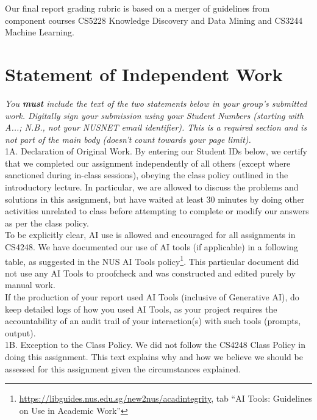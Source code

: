 \documentclass[11pt]{article}
\begin{document}
Our final report grading rubric is based on a merger of guidelines from component courses CS5228 Knowledge Discovery and Data Mining and CS3244 Machine Learning.

\section*{Statement of Independent Work}

{\it You {\bf must} include the text of the two statements below in your group's submitted work.  Digitally sign your submission using your Student Numbers (starting with A...; N.B., not your NUSNET email identifier). This is a required section and is not part of the main body (doesn't count towards your page limit).} \\

\noindent 1A. Declaration of Original Work. By entering our Student IDs below, we certify that we completed our assignment independently of all others (except where sanctioned during in-class sessions), obeying the class policy outlined in the introductory lecture. In particular, we are allowed to discuss the problems and solutions in this assignment, but have waited at least 30 minutes by doing other activities unrelated to class before attempting to complete or modify our answers as per the class policy. \\

To be explicitly clear, AI use is allowed and encouraged for all assignments in CS4248.  We have documented our use of AI tools (if applicable) in a following table, as suggested in the NUS AI Tools policy\footnote{\url{https://libguides.nus.edu.sg/new2nus/acadintegrity}, tab ``AI Tools: Guidelines on Use in Academic Work''}.  This particular document did not use any AI Tools to proofcheck and was constructed and edited purely by manual work.\\

If the production of your report used AI Tools (inclusive of Generative AI), do keep detailed logs of how you used AI Tools, as your project requires the accountability of an audit trail of your interaction(s) with such tools (prompts, output).\\ 

\noindent 1B. Exception to the Class Policy. We did not follow the CS4248 Class Policy in doing this assignment. This text explains why and how we believe we should be assessed for this assignment given the circumstances explained. \\
\end{document}
